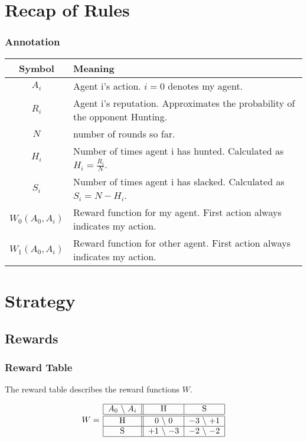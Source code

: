 \documentclass[10pt,fleqn]{article}
\begin{document}
\section{Recap of Rules}

\subsubsection{Annotation}

\begin{tabular}{|c|l|}
  \hline
  Symbol & Meaning \\
  \hline \hline
  $A_i$ & Agent i's action. $i = 0$ denotes my agent. \\
  \hline
  $R_i$ & Agent i's reputation. Approximates the probability of the opponent Hunting. \\
  \hline
  $N$ & number of rounds so far. \\
  \hline
  $H_i$ & Number of times agent i has hunted. Calculated as $H_i = \frac{R_i}{N}$. \\
  \hline
  $S_i$ & Number of times agent i has slacked. Calculated as $S_i = N - H_i$. \\
  \hline
  $W_0(A_0, A_i)$ & Reward function for my agent. First action always indicates
  my action. \\
  \hline
  $W_1(A_0, A_i)$ & Reward function for other agent. First action always indicates
  my action. \\
  \hline
\end{tabular}

\section{Strategy}

\subsection{Rewards}

\subsubsection{Reward Table}
The reward table describes the reward functions $W$.

\begin{figure}[h!]
  \centering
  \begin{equation*}
    W =\, 
      \begin{tabular}{|c||c|c|}
        \hline
        $A_0$ \textbackslash\ $A_i$ & H & S \\
        \hline\hline
        H & $0$ \textbackslash\ $0$ & $-3$ \textbackslash\ $+1$ \\
        \hline
        S & $+1$ \textbackslash\ $-3$ & $-2$ \textbackslash\ $-2$ \\
        \hline
      \end{tabular}
  \end{equation*}
\end{figure}
\end{document}
